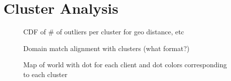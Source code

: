 \section{Cluster Analysis} \label{sect:analysis}


\begin{figure}
    \caption{CDF of # of outliers per cluster for geo distance, etc}
\end{figure}

\begin{figure}
    \caption{Domain match alignment with clusters (what format?)}
\end{figure}

\begin{figure}
    \caption{Map of world with dot for each client and dot colors corresponding to each cluster}
\end{figure}

